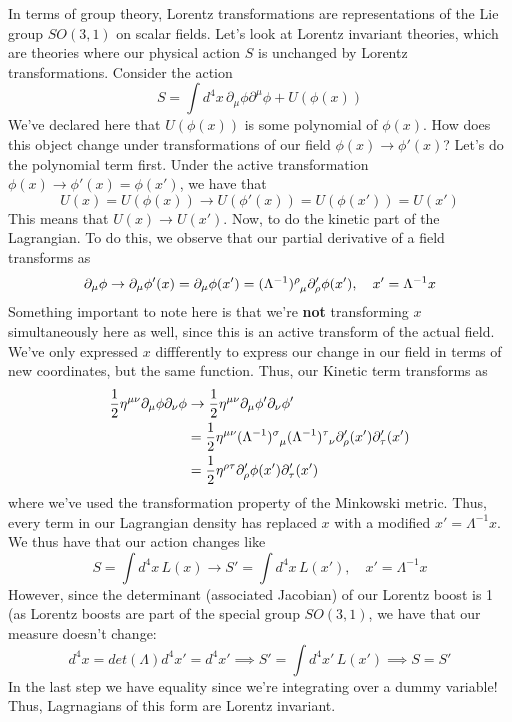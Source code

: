 In terms of group theory, Lorentz transformations are representations of the Lie group $SO( 3, 1)$ on scalar fields. Let's look at Lorentz invariant theories, which are theories where our physical action $S$ is unchanged by Lorentz transformations. Consider the action 
\[ 
S = \int d^4 x \, \partial_\mu \phi \partial^\mu \phi + U ( \phi(x) ) 
\]
We've declared here that $U ( \phi (x) )$ is some polynomial of $\phi(x)$.  
How does this object change under transformations of our field $\phi( x)  \rightarrow \phi ' ( x) $? Let's do the polynomial term first. Under the active transformation $ \phi(x) \rightarrow \phi' (x) = \phi ( x' )$, we have that 
\[ 
U ( x)  = U ( \phi (x) ) \rightarrow U ( \phi' (x) ) = U ( \phi (x') ) = U ( x') 
\]
This means that $U (x) \rightarrow U ( x')$. Now, to do the kinetic part of the Lagrangian.  
To do this, we observe that our partial derivative of a field transforms as 
\[ 
\partial_\mu \phi \rightarrow \partial_\mu \phi'( x ) = \partial_\mu \phi(x' )  = (\Lambda^{-1} )\indices{^\rho_\mu} \partial'_\rho \phi(x'), \quad x'  =\Lambda^{ -1} x 
\] 
Something important to note here is that we're \textbf{ not} transforming $x$ simultaneously here as well, since this is an active transform of the actual field. We've only expressed $x$ diffferently to express our change in our field in terms of new coordinates, but the same function. 
Thus, our Kinetic term transforms as 
\begin{align*}
\frac{1}{2} \eta^{ \mu \nu} \partial_\mu \phi \partial_\nu \phi & \rightarrow \frac{1}{2} \eta^{ \mu \nu} \partial_\mu \phi' \partial_\nu \phi' \\
&= \frac{1}{2} \eta^{ \mu \nu} ( \Lambda^{ -1})\indices{^\sigma_\mu} ( \Lambda^{ -1} ) \indices{^\tau_\nu} \partial'_\rho ( x' ) \partial'_\tau ( x' ) \\
& = \frac{1}{ 2} \eta^{ \rho \tau} \partial_\rho' \phi(x') \partial_\tau'(x') 
\end{align*} 
where we've used the transformation property of the Minkowski metric. Thus, every term in our Lagrangian density has replaced $x$ with a modified $ x '  = \Lambda^{ -1} x $. We thus have that our action changes like 
\[ 
S = \int d^4 x \, L (x) \rightarrow  S'  = \int d^4 x \, L ( x' ), \quad x' = \Lambda^{ -1}  x 
\] 
However, since the determinant (associated Jacobian) of our Lorentz boost is 1 (as Lorentz boosts are part of the special group $SO(3,1)$, we have that our measure doesn't change: 
\[ 
d^4 x  = det ( \Lambda ) d^4 x'  = d^4 x' \implies S' = \int d^4 x' \, L ( x' )  \implies S = S'
\] 
In the last step we have equality since we're integrating over a dummy variable! Thus, Lagrnagians of this form are Lorentz invariant. 

\pagebreak 

